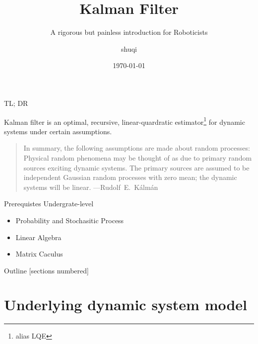 \documentclass[utf-8, 10pt, aspectratio=1610]{beamer}
\title{Kalman Filter}
\subtitle{A rigorous but painless introduction for Roboticists}
\author{shuqi}
\date{\today}
\institute{
    \faGithub\;
    \href{https://github.com/xiaosq2000}{xiaosq2000}
    \quad
    \faEnvelope\;
    \href{xiaosq2000@gmail.com}{xiaosq2000@gmail.com}
}
\begin{document}
\begin{frame}
	\titlepage
\end{frame}

\begin{frame}{TL; DR}
	\par Kalman filter is an optimal, recursive, linear-quardratic estimator\footnote{alias \alert{LQE}} for dynamic systems under certain assumptions.
	\vspace*{\fill}

	\begin{quote}
		In summary, the following assumptions are made about random processes: Physical random phenomena may be thought of as due to primary random sources exciting dynamic systems. The primary sources are assumed to be independent Gaussian random processes with zero mean; the dynamic systems will be linear.\supercite{kalman_new_1960}
		\flushright ---\;\textrm{Rudolf\ E.\ Kálmán}
	\end{quote}
\end{frame}

\begin{frame}{Prerequistes}
	Undergrate-level
	\begin{itemize}
		\item Probability and Stochasitic Process
		\item Linear Algebra
		\item Matrix Caculus
	\end{itemize}
\end{frame}

\begin{frame}{Outline}
	[sections numbered]
	\tableofcontents[hideallsubsections]
\end{frame}

\section{Underlying dynamic system model}
\end{document}
